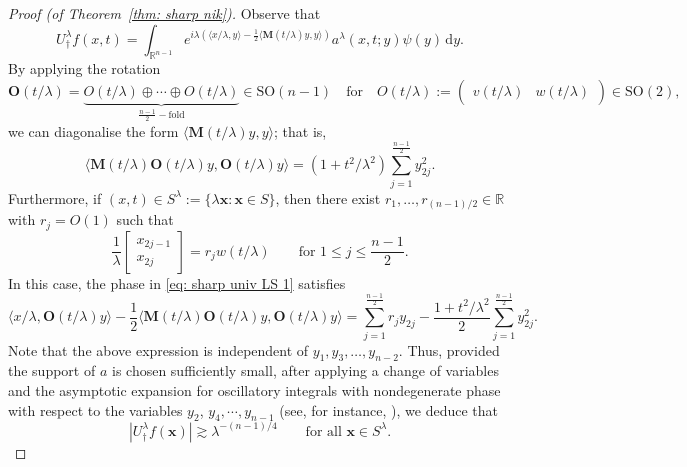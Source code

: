 \documentclass[reqno]{amsart}
\numberwithin{equation}{section}
\newcommand{\R}{\mathbb{R}}
\newcommand{\ud}{\mathrm{d}}
\newcommand{\by}{\mathbf{x}}
\newcommand{\bx}{\mathbf{x}}
\newcommand{\bM}{\mathbf{M}}
\newcommand{\bO}{\mathbf{O}}
\def\inn#1#2{\langle#1,#2\rangle}
\theoremstyle{plain}
\theoremstyle{definition}
\begin{document}
\begin{proof}[Proof (of Theorem~\ref{thm: sharp nik})]
Observe that
\begin{equation}\label{eq: sharp univ LS 1}
    U_{\dagger}^{\lambda}f(x,t) = \int_{\R^{n-1}} e^{i \lambda(\inn{x/\lambda}{y} - \frac{1}{2}\inn{\bM(t/\lambda)y}{y})}  a^{\lambda}(x,t;y)\psi(y)\,\ud y.
\end{equation}
By applying the rotation 
\begin{equation*}
   \bO(t/\lambda) = \underbrace{O(t/\lambda) \oplus \cdots \oplus O(t/\lambda)}_{\frac{n-1}{2}-\textrm{fold}} \in \mathrm{SO}(n-1) \quad \textrm{for} \quad O(t/\lambda) :=
\begin{pmatrix}
v(t/\lambda) & w(t/\lambda)
\end{pmatrix} \in \mathrm{SO}(2),
\end{equation*}
we can diagonalise the form $\inn{\bM(t/\lambda)y}{y}$; that is, 
\begin{equation*}
   \inn{\bM(t/\lambda)\bO(t/\lambda)y}{\bO(t/\lambda)y} = (1+t^2/\lambda^2) \sum_{j = 1}^{\frac{n-1}{2}} y_{2j}^2.
\end{equation*}
Furthermore, if $(x, t) \in S^{\lambda} := \{\lambda \by : \by \in S\}$, then there exist $r_1, \dots,r_{(n-1)/2} \in \R$ with $r_j = O(1)$ such that
\begin{equation*}
    \frac{1}{\lambda}\begin{bmatrix}
        x_{2j-1} \\
        x_{2j}
    \end{bmatrix}
    = 
    r_j w(t/\lambda) \qquad \textrm{for $1 \leq j \leq \frac{n-1}{2}$}.
\end{equation*}
In this case, the phase in \eqref{eq: sharp univ LS 1} satisfies
\begin{equation*}
    \inn{x/\lambda}{\bO(t/\lambda) y} - \frac{1}{2}\inn{\bM(t/\lambda)\bO(t/\lambda) y}{\bO(t/\lambda) y} =  \sum_{j = 1}^{\frac{n-1}{2}} r_j y_{2j} - \frac{1 + t^2/\lambda^2}{2}\sum_{j = 1}^{\frac{n-1}{2}} y_{2j}^2. 
\end{equation*}
Note that the above expression is independent of $y_1, y_3, \dots, y_{n-2}$. Thus, provided the support of $a$ is chosen sufficiently small, after applying a change of variables and the asymptotic expansion for oscillatory integrals with nondegenerate phase with respect to the variables $y_2$, $y_4, \cdots, y_{n-1}$  (see, for instance, \cite[Chapter VIII, Proposition 6, p.344]{Stein1993}), we deduce that
\begin{equation*}
    |U_{\dagger}^{\lambda}f(\bx)| \gtrsim \lambda^{-(n-1)/4} \qquad \textrm{for all $\bx \in S^{\lambda}$.}
\end{equation*}

\end{proof}
\end{document}
